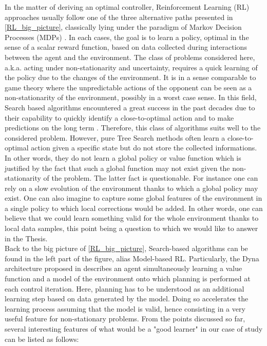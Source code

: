 \documentclass[]{article}
\begin{document}
In the matter of deriving an optimal controller, Reinforcement Learning (RL) approaches usually follow one of the three alternative paths presented in \ref{RL_big_picture}, classically lying under the paradigm of Markov Decision Processes (MDPs) \cite{sutton1998reinforcement,szepesvari2010algorithms}. In each cases, the goal is to learn a policy, optimal in the sense of a scalar reward function, based on data collected during interactions between the agent and the environment. The class of problems considered here, a.k.a. acting under non-stationarity and uncertainty, requires a quick learning of the policy due to the changes of the environment. It is in a sense comparable to game theory where the unpredictable actions of the opponent can be seen as a non-stationarity of the environment, possibly in a worst case sense. In this field, Search based algorithms encountered a great success in the past decades due to their capability to quickly identify a close-to-optimal action and to make predictions on the long term \cite{browne2012survey, keller2013trial, keller2012prost, gelly2011monte, silver2012temporal}. Therefore, this class of algorithms suits well to the considered problem. However, pure Tree Search methods often learn a close-to-optimal action given a specific state but do not store the collected informations. In other words, they do not learn a global policy or value function which is justified by the fact that such a global function may not exist given the non-stationarity of the problem. The latter fact is questionable. For instance one can rely on a slow evolution of the environment thanks to which a global policy may exist. One can also imagine to capture some global features of the environment in a single policy to which local corrections would be added. In other words, one can believe that we could learn something valid for the whole environment thanks to local data samples, this point being a question to which we would like to answer in the Thesis.\\
Back to the big picture of \ref{RL_big_picture}, Search-based algorithms can be found in the left part of the figure, alias Model-based RL. Particularly, the Dyna architecture proposed in \cite{sutton1998reinforcement} describes an agent simultaneously learning a value function and a model of the environment onto which planning is performed at each control iteration. Here, planning has to be understood as an additional learning step based on data generated by the model. Doing so accelerates the learning process assuming that the model is valid, hence consisting in a very useful feature for non-stationary problems. From the points discussed so far, several interesting features of what would be a "good learner" in our case of study can be listed as follows:
\end{document}

